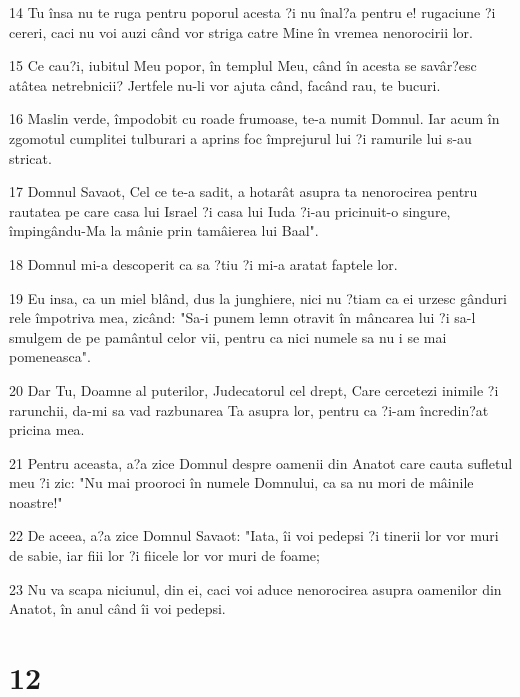 \par 14 Tu însa nu te ruga pentru poporul acesta ?i nu înal?a pentru e! rugaciune ?i cereri, caci nu voi auzi când vor striga catre Mine în vremea nenorocirii lor.
\par 15 Ce cau?i, iubitul Meu popor, în templul Meu, când în acesta se savâr?esc atâtea netrebnicii? Jertfele nu-li vor ajuta când, facând rau, te bucuri.
\par 16 Maslin verde, împodobit cu roade frumoase, te-a numit Domnul. Iar acum în zgomotul cumplitei tulburari a aprins foc împrejurul lui ?i ramurile lui s-au stricat.
\par 17 Domnul Savaot, Cel ce te-a sadit, a hotarât asupra ta nenorocirea pentru rautatea pe care casa lui Israel ?i casa lui Iuda ?i-au pricinuit-o singure, împingându-Ma la mânie prin tamâierea lui Baal".
\par 18 Domnul mi-a descoperit ca sa ?tiu ?i mi-a aratat faptele lor.
\par 19 Eu insa, ca un miel blând, dus la junghiere, nici nu ?tiam ca ei urzesc gânduri rele împotriva mea, zicând: "Sa-i punem lemn otravit în mâncarea lui ?i sa-l smulgem de pe pamântul celor vii, pentru ca nici numele sa nu i se mai pomeneasca".
\par 20 Dar Tu, Doamne al puterilor, Judecatorul cel drept, Care cercetezi inimile ?i rarunchii, da-mi sa vad razbunarea Ta asupra lor, pentru ca ?i-am încredin?at pricina mea.
\par 21 Pentru aceasta, a?a zice Domnul despre oamenii din Anatot care cauta sufletul meu ?i zic: "Nu mai prooroci în numele Domnului, ca sa nu mori de mâinile noastre!"
\par 22 De aceea, a?a zice Domnul Savaot: "Iata, îi voi pedepsi ?i tinerii lor vor muri de sabie, iar fiii lor ?i fiicele lor vor muri de foame;
\par 23 Nu va scapa niciunul, din ei, caci voi aduce nenorocirea asupra oamenilor din Anatot, în anul când îi voi pedepsi.

\chapter{12}

